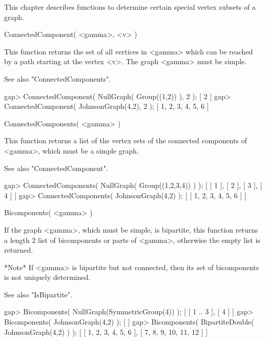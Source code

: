 %
%
%
%
\def\GRAPE{\sf GRAPE}
\def\nauty{\it nauty}
\def\G{\Gamma}
\def\Aut{{\rm Aut}\,}
\def\x{\times}

This chapter describes functions to determine certain special vertex
subsets of a graph.


\>ConnectedComponent( <gamma>, <v> )

This function  returns the set  of all vertices  in <gamma> which  can be
reached by a path starting at the vertex  <v>.  The graph <gamma> must be
simple.

See also "ConnectedComponents".

\beginexample
gap> ConnectedComponent( NullGraph( Group((1,2)) ), 2 );
[ 2 ]
gap> ConnectedComponent( JohnsonGraph(4,2), 2 );
[ 1, 2, 3, 4, 5, 6 ] 
\endexample


\>ConnectedComponents( <gamma> )

This  function returns  a  list  of  the  vertex  sets  of  the connected
components of <gamma>, which must be a simple graph.

See also "ConnectedComponent".

\beginexample
gap> ConnectedComponents( NullGraph( Group((1,2,3,4)) ) );
[ [ 1 ], [ 2 ], [ 3 ], [ 4 ] ]
gap> ConnectedComponents( JohnsonGraph(4,2) );
[ [ 1, 2, 3, 4, 5, 6 ] ] 
\endexample


\>Bicomponents( <gamma> )

If the graph  <gamma>, which must be simple,  is bipartite, this function
returns  a length 2 list  of  bicomponents or parts of <gamma>, otherwise
the empty list is returned.

*Note* If <gamma> is bipartite but not connected, then its set of
bicomponents is not uniquely determined.  

See also "IsBipartite".

\beginexample
gap> Bicomponents( NullGraph(SymmetricGroup(4)) );
[ [ 1 .. 3 ], [ 4 ] ]
gap> Bicomponents( JohnsonGraph(4,2) );
[  ]
gap> Bicomponents( BipartiteDouble( JohnsonGraph(4,2) ) );
[ [ 1, 2, 3, 4, 5, 6 ], [ 7, 8, 9, 10, 11, 12 ] ]
\endexample

